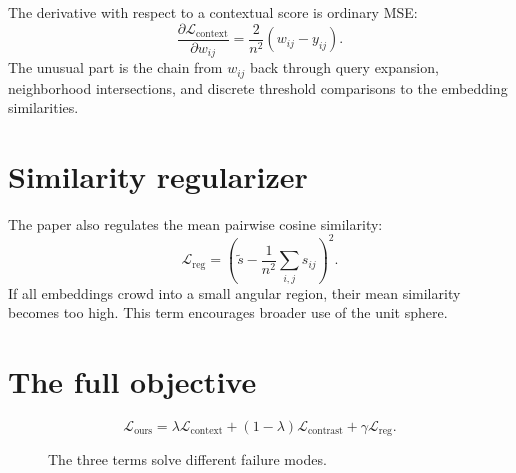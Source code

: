 \documentclass[11pt,oneside,openany]{book}
\theoremstyle{myplain}
\theoremstyle{definition}
\newcommand{\paperEq}[1]{\tag{P#1}}
\begin{document}
The derivative with respect to a contextual score is ordinary MSE:
\begin{equation}
  \frac{\partial\mathcal L_{\mathrm{context}}}{\partial w_{ij}}
  =\frac{2}{n^2}(w_{ij}-y_{ij}).
  \label{eq:msegrad}
\end{equation}
The unusual part is the chain from $w_{ij}$ back through query expansion, neighborhood intersections, and discrete threshold comparisons to the embedding similarities.

\section{Similarity regularizer}

The paper also regulates the mean pairwise cosine similarity:
\begin{equation*}
  \mathcal L_{\mathrm{reg}}
  =\left(\tilde s-\frac{1}{n^2}\sum_{i,j}s_{ij}\right)^2.
\paperEq{7}
\label{eq:lreg}
\end{equation*}
If all embeddings crowd into a small angular region, their mean similarity becomes too high. This term encourages broader use of the unit sphere.

\section{The full objective}

\begin{equation*}
  \boxed{
  \mathcal L_{\mathrm{ours}}
  =\lambda\mathcal L_{\mathrm{context}}
  +(1-\lambda)\mathcal L_{\mathrm{contrast}}
  +\gamma\mathcal L_{\mathrm{reg}}.}
\paperEq{6}
\label{eq:full-objective}
\end{equation*}

\begin{figure}[H]
\centering
{}
\caption{The three terms solve different failure modes.}
\label{fig:loss-roles}
\end{figure}
\end{document}
